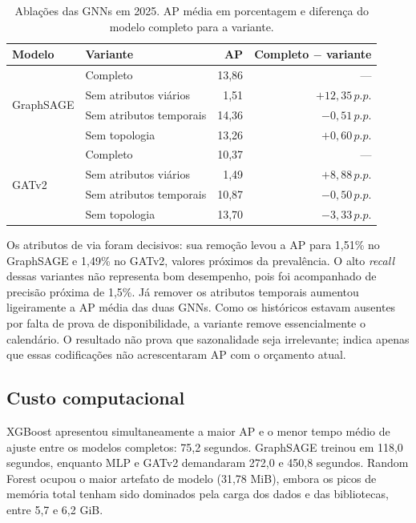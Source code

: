 \documentclass[12pt]{article}
\newcommand{\pp}{\,p.p.}
\begin{document}
\begin{table}[htbp]
\centering
\caption{Ablações das GNNs em 2025. AP média em porcentagem e diferença
do modelo completo para a variante.}
\label{tab:ablacoes}
\small
\setlength{\tabcolsep}{5pt}
\begin{tabular}{llrr}
\toprule
\textbf{Modelo} & \textbf{Variante} & \textbf{AP} &
\textbf{Completo $-$ variante} \\
\midrule
\multirow{4}{*}{GraphSAGE}
& Completo & 13,86 & --- \\
& Sem atributos viários & 1,51 & $+12,35\pp$ \\
& Sem atributos temporais & 14,36 & $-0,51\pp$ \\
& Sem topologia & 13,26 & $+0,60\pp$ \\
\midrule
\multirow{4}{*}{GATv2}
& Completo & 10,37 & --- \\
& Sem atributos viários & 1,49 & $+8,88\pp$ \\
& Sem atributos temporais & 10,87 & $-0,50\pp$ \\
& Sem topologia & 13,70 & $-3,33\pp$ \\
\bottomrule
\end{tabular}
\end{table}

Os atributos de via foram decisivos: sua remoção levou a AP para 1,51\%
no GraphSAGE e 1,49\% no GATv2, valores próximos da prevalência. O alto
\textit{recall} dessas variantes não representa bom desempenho, pois
foi acompanhado de precisão próxima de 1,5\%. Já remover os atributos
temporais aumentou ligeiramente a AP média das duas GNNs. Como os
históricos estavam ausentes por falta de prova de disponibilidade, a
variante remove essencialmente o calendário. O resultado não prova que
sazonalidade seja irrelevante; indica apenas que essas codificações não
acrescentaram AP com o orçamento atual.

\subsection{Custo computacional}

XGBoost apresentou simultaneamente a maior AP e o menor tempo médio de
ajuste entre os modelos completos: 75,2 segundos. GraphSAGE treinou em
118,0 segundos, enquanto MLP e GATv2 demandaram 272,0 e 450,8 segundos.
Random Forest ocupou o maior artefato de modelo (31,78 MiB), embora os
picos de memória total tenham sido dominados pela carga dos dados e das
bibliotecas, entre 5,7 e 6,2 GiB.
\end{document}
